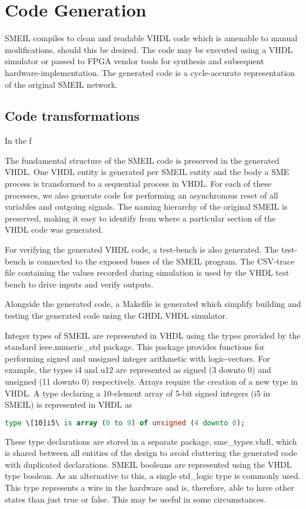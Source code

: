 \chapter{Code Generation}
\label{sec:codegen}
SMEIL compiles to clean and readable VHDL code which is amenable to manual
modifications, should this be desired. The code may be executed using a VHDL
simulator or passed to FPGA vendor tools for synthesis and subsequent
hardware-implementation. The generated code is a cycle-accurate representation
of the original SMEIL network.

\section{Code transformations}
In the f

The fundamental structure of the SMEIL code is preserved in the generated
VHDL. One VHDL entity is generated per SMEIL entity and the body a SME process
is transformed to a sequential process in VHDL. For each of these processes, we
also generate code for performing an asynchronous reset of all variables and
outgoing signals. The naming hierarchy of the original SMEIL is preserved,
making it easy to identify from where a particular section of the VHDL code was
generated.

For verifying the generated VHDL code, a test-bench is also generated. The
test-bench is connected to the {\ttfamily exposed} buses of the SMEIL program. The
CSV-trace file containing the values recorded during simulation is used by the
VHDL test bench to drive inputs and verify outputs.

Alongside the generated code, a {\ttfamily Makefile} is generated which simplify
building and testing the generated code using the GHDL VHDL simulator.

Integer types of SMEIL are represented in VHDL using the types provided by the
standard {\ttfamily ieee.numeric\_std} package. This package provides functions for
performing signed and unsigned integer arithmetic with logic-vectors. For
example, the types {\ttfamily i4} and {\ttfamily u12} are represented as {\ttfamily signed (3
  downto 0)} and {\ttfamily unsigned (11 downto 0)} respectively. Arrays require the
creation of a new {\ttfamily type} in VHDL. A {\ttfamily type} declaring a 10-element array
of 5-bit signed integers ({\ttfamily [10]i5} in SMEIL) is represented in VHDL as
\begin{lstlisting}[language=vhdl]
type \[10]i5\ is array (0 to 9) of unsigned (4 downto 0);
\end{lstlisting}
These type declarations are stored in a separate package, {\ttfamily sme\_types.vhdl},
which is shared between all entities of the design to avoid cluttering the
generated code with duplicated declarations. SMEIL booleans are represented
using the VHDL type {\ttfamily boolean}. As an alternative to this, a single {\ttfamily
  std\_logic} type is commonly used. This type represents a wire in the hardware
and is, therefore, able to have other states than just true or false. This may
be useful in some circumstances.

